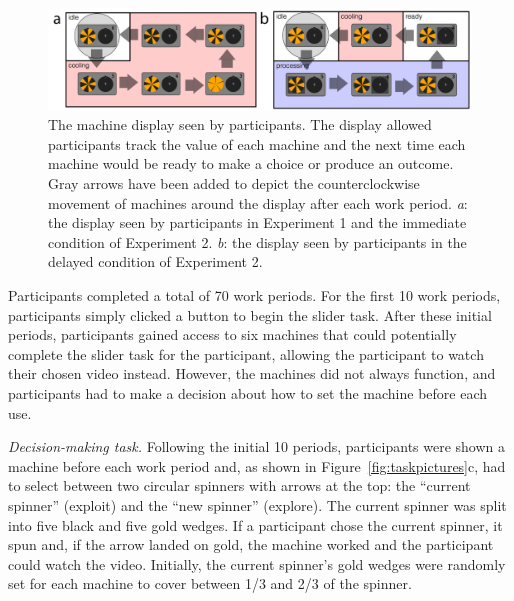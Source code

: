 \documentclass[10pt,letterpaper]{article}
\begin{document}
\begin{figure}
\centering
\includegraphics[width=\textwidth]{figures/machinemappictures.png}
\caption{The machine display seen by participants. The display allowed participants track
  the value of each machine and the next time each machine would be ready to
  make a choice or produce an outcome. Gray arrows have been added to depict the
  counterclockwise movement of machines around the display after each work
  period.
  \emph{a}: the display seen by participants in Experiment 1 and the immediate condition of Experiment 2.
  \emph{b}: the display seen by participants in the delayed condition of
  Experiment 2.}
\label{fig:machinemappictures}
\end{figure}

Participants completed a total of 70 work
periods. For the first 10 work periods, participants simply clicked a button to begin the
slider task. After these initial periods, participants gained access to six
machines that could potentially complete the slider task for the participant,
allowing the participant to watch their chosen video instead. However, the
machines did not always function, and participants had to make a decision about
how to set the machine before each use.

\emph{Decision-making task.}
Following the initial 10 periods, participants were shown a machine before each
work period and,
as shown in Figure~\ref{fig:taskpictures}c, had to select
between two circular spinners with arrows at the top: the ``current spinner''
(exploit) and the ``new spinner'' (explore).
The current spinner was split into
five black and five gold wedges. If a participant chose the
current spinner, it spun and, if the arrow landed on gold, the machine
worked and the participant could watch the video. Initially, the
current spinner's gold wedges were randomly set for each machine to cover between
1/3 and 2/3 of the spinner.
\end{document}
